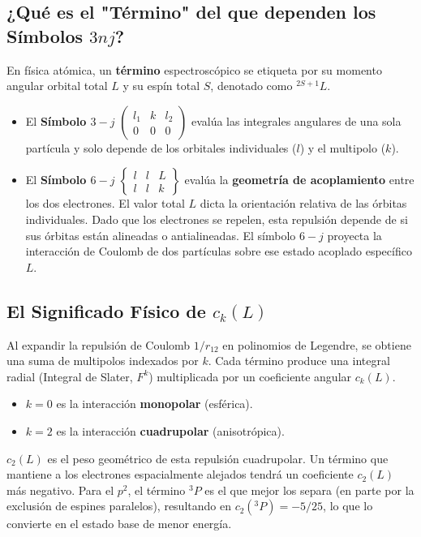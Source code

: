 \documentclass[11pt,a4paper]{article}
\begin{document}
\subsection{¿Qué es el "Término" del que dependen los Símbolos $3nj$?}
En física atómica, un \textbf{término} espectroscópico se etiqueta por su momento angular orbital total $L$ y su espín total $S$, denotado como $^{2S+1}L$.
\begin{itemize}
    \item El \textbf{Símbolo $3-j$} $\begin{pmatrix} l_1 & k & l_2 \\ 0 & 0 & 0 \end{pmatrix}$ evalúa las integrales angulares de una sola partícula y solo depende de los orbitales individuales ($l$) y el multipolo ($k$).
    \item El \textbf{Símbolo $6-j$} $\begin{Bmatrix} l & l & L \\ l & l & k \end{Bmatrix}$ evalúa la \textbf{geometría de acoplamiento} entre los dos electrones. El valor total $L$ dicta la orientación relativa de las órbitas individuales. Dado que los electrones se repelen, esta repulsión depende de si sus órbitas están alineadas o antialineadas. El símbolo $6-j$ proyecta la interacción de Coulomb de dos partículas sobre ese estado acoplado específico $L$.
\end{itemize}

\subsection{El Significado Físico de $c_k(L)$}
Al expandir la repulsión de Coulomb $1/r_{12}$ en polinomios de Legendre, se obtiene una suma de multipolos indexados por $k$. Cada término produce una integral radial (Integral de Slater, $F^k$) multiplicada por un coeficiente angular $c_k(L)$.
\begin{itemize}
    \item $k=0$ es la interacción \textbf{monopolar} (esférica).
    \item $k=2$ es la interacción \textbf{cuadrupolar} (anisotrópica).
\end{itemize}
$c_2(L)$ es el peso geométrico de esta repulsión cuadrupolar. Un término que mantiene a los electrones espacialmente alejados tendrá un coeficiente $c_2(L)$ más negativo. Para el $p^2$, el término $^3P$ es el que mejor los separa (en parte por la exclusión de espines paralelos), resultando en $c_2(^3P) = -5/25$, lo que lo convierte en el estado base de menor energía.
\end{document}
